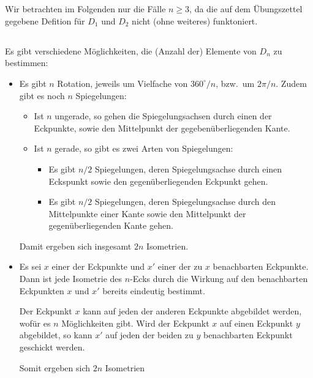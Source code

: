 \section{}

Wir betrachten im Folgenden nur die Fälle $n \geq 3$, da die auf dem Übungszettel gegebene Defition für $D_1$ und $D_2$ nicht (ohne weiteres) funktoniert.





\subsection{}

Es gibt verschiedene Möglichkeiten, die (Anzahl der) Elemente von $D_n$ zu bestimmen:

\begin{itemize}
  \item
    Es gibt $n$ Rotation, jeweils um Vielfache von $360^\circ/n$, bzw.\ um $2\pi/n$.
    Zudem gibt es noch $n$ Spiegelungen:
    \begin{itemize}
      \item
        Ist $n$ ungerade, so gehen die Spiegelungsachsen durch einen der Eckpunkte, sowie den Mittelpunkt der gegebenüberliegenden Kante.
      \item
        Ist $n$ gerade, so gibt es zwei Arten von Spiegelungen:
        \begin{itemize}
          \item
            Es gibt $n/2$ Spiegelungen, deren Spiegelungsachse durch einen Eckspunkt sowie den gegenüberliegenden Eckpunkt gehen.
          \item
            Es gibt $n/2$ Spiegelungen, deren Spiegelungsachse durch den Mittelpunkte einer Kante sowie den Mittelpunkt der gegenüberliegenden Kante gehen.
        \end{itemize}
    \end{itemize}
    Damit ergeben sich insgesamt $2n$ Isometrien.
    
  \item
    Es sei $x$ einer der Eckpunkte und $x'$ einer der zu $x$ benachbarten Eckpunkte.
    Dann ist jede Isometrie des $n$-Ecks durch die Wirkung auf den benachbarten Eckpunkten $x$ und $x'$ bereits eindeutig bestimmt.
    
    Der Eckpunkt $x$ kann auf jeden der anderen Eckpunkte abgebildet werden, wofür es $n$ Möglichkeiten gibt.
    Wird der Eckpunkt $x$ auf einen Eckpunkt $y$ abgebildet, so kann $x'$ auf jeden der beiden zu $y$ benachbarten Eckpunkt geschickt werden.
    
    Somit ergeben sich $2n$ Isometrien
\end{itemize}

